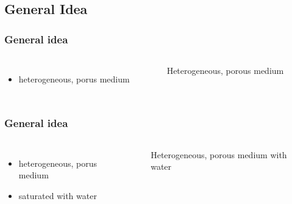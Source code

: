 
\section{\COT}
\subsection{General Idea}

\begin{frame}
	\frametitle{General idea}
	
	\begin{columns}[t]
		\column{5cm}
		\vspace{1cm}
		\begin{itemize}
		  \item heterogeneous, porus medium
		\end{itemize}
		
		\column{5cm}
		\begin{figure}
		  \centering
		  \caption{Heterogeneous, porous medium}
		\end{figure}
      \end{columns}
\end{frame}

\begin{frame}
	\frametitle{General idea}
	
	\begin{columns}[t]
		\column{5cm}
		\vspace{1cm}
		\begin{itemize}
		  \item heterogeneous, porus medium
		  \item saturated with water
		\end{itemize}
    
		\column{5cm}
		\begin{figure}
		  \centering
		  \caption{Heterogeneous, porous medium with water}
		\end{figure}
      \end{columns}
\end{frame}

